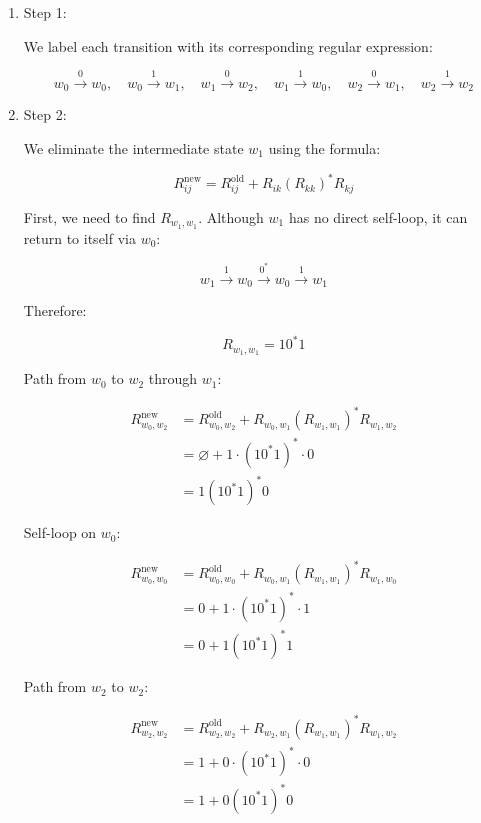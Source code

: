 \documentclass[12pt,a4paper,openany]{article}
\begin{document}
\begin{enumerate}

\item Step 1: 

We label each transition with its corresponding regular expression:

\[
w_0 \xrightarrow{0} w_0 , \quad
w_0 \xrightarrow{1} w_1, \quad
w_1 \xrightarrow{0} w_2, \quad
w_1 \xrightarrow{1} w_0, \quad
w_2 \xrightarrow{0} w_1, \quad
w_2 \xrightarrow{1} w_2 
\]

\item Step 2: 

We eliminate the intermediate state $w_1$ using the formula:

\[
R_{ij}^{\text{new}} = R_{ij}^{\text{old}} + R_{ik}(R_{kk})^*R_{kj}
\]

First, we need to find $R_{w_1,w_1}$. Although $w_1$ has no direct self-loop, it can return to itself via $w_0$:

\[w_1 \xrightarrow{1} w_0 \xrightarrow{0^*} w_0 \xrightarrow{1} w_1\]

Therefore:

\[
R_{w_1,w_1} = 10^*1
\]

Path from $w_0$ to $w_2$ through $w_1$:

\[
\begin{aligned}
R_{w_0,w_2}^{\text{new}} &= R_{w_0,w_2}^{\text{old}} + R_{w_0,w_1}(R_{w_1,w_1})^*R_{w_1,w_2} \\
&= \varnothing + 1 \cdot (10^*1)^* \cdot 0 \\
&= 1(10^*1)^*0
\end{aligned}
\]

Self-loop on $w_0$:

\[
\begin{aligned}
R_{w_0,w_0}^{\text{new}} &= R_{w_0,w_0}^{\text{old}} + R_{w_0,w_1}(R_{w_1,w_1})^*R_{w_1,w_0} \\
&= 0 + 1 \cdot (10^*1)^* \cdot 1 \\
&= 0 + 1(10^*1)^*1
\end{aligned}
\]

Path from $w_2$ to $w_2$:

\[
\begin{aligned}
R_{w_2,w_2}^{\text{new}} &= R_{w_2,w_2}^{\text{old}} + R_{w_2,w_1}(R_{w_1,w_1})^*R_{w_1,w_2} \\
&= 1 + 0 \cdot (10^*1)^* \cdot 0 \\
&= 1 + 0(10^*1)^*0
\end{aligned}
\]


\end{enumerate}
\end{document}
